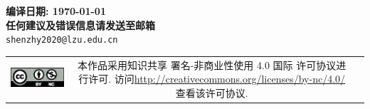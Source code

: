 \documentclass{qbook}
\begin{document}
\pagestyle{empty}
\begin{center}
	\Large{\sffamily\bfseries\heiti 编译日期: \today} \\ \vspace{1em}
	\Large{\sffamily\bfseries\heiti 任何建议及错误信息请发送至邮箱} \\
	\texttt{shenzhy2020@lzu.edu.cn}
\end{center} 
\vfill
\vspace{30em}
\begin{tabular*}{\textwidth}{ccc}
	\includegraphics{figure/by-nc.eps}
	& \begin{minipage}[b]{0.6\textwidth}
		\small\sffamily
		本作品采用知识共享 署名-非商业性使用 4.0 国际 许可协议进行许可. 访问\url{http://creativecommons.org/licenses/by-nc/4.0/}查看该许可协议.
	\end{minipage}
\end{tabular*}  
\thispagestyle{empty}
\frontmatter  %
\pagestyle{empty}

\pagestyle{empty}

\tableofcontents
\cleardoublepage
\mainmatter	  %
\pagestyle{fancy}
\setcounter{page}{0}


\backmatter
\printbibliography[heading=bibintoc]
\printindex
\makeatletter
\makeatother
\end{document}
